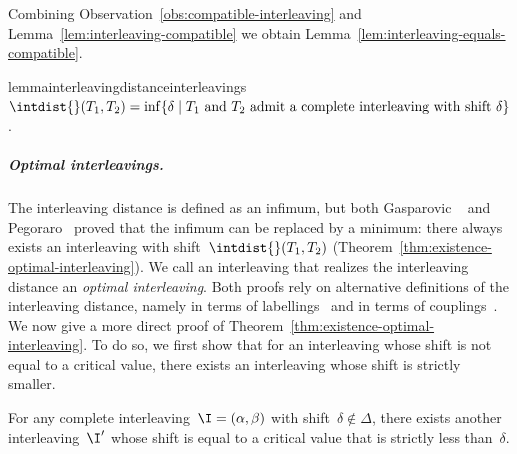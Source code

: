 %
\noindent
Combining Observation~\ref{obs:compatible-interleaving} and Lemma~\ref{lem:interleaving-compatible} we obtain Lemma~\ref{lem:interleaving-equals-compatible}.
%
\begin{restatable}{lemma}{interleavingdistanceinterleavings}
\label{lem:interleaving-equals-compatible}
	$\intdist{}(T_1, T_2) = \inf\{\delta \mid T_1 \text{ and } T_2 \text{ admit a complete interleaving with shift } \delta \}$.
\end{restatable}
%
\subparagraph{Optimal interleavings.}
The interleaving distance is defined as an infimum, but both Gasparovic \etal~\cite{gasparovic2019intrinsic} and Pegoraro~\cite{pegoraro2025graph-matching} proved that the infimum can be replaced by a minimum: there always exists an interleaving with shift~$\intdist{}(T_1, T_2)$ (Theorem~\ref{thm:existence-optimal-interleaving}).
We call an interleaving that realizes the interleaving distance an \emph{optimal interleaving}.
Both proofs rely on alternative definitions of the interleaving distance, namely in terms of labellings~\cite{gasparovic2019intrinsic} and in terms of couplings~\cite{pegoraro2025graph-matching}.
We now give a more direct proof of Theorem~\ref{thm:existence-optimal-interleaving}.
To do so, we first show that for an interleaving whose shift is not equal to a critical value, there exists an interleaving whose shift is strictly smaller.
%
\newpage
\begin{lemma}\label{lem:existence-optimal-interleaving}
	For any complete interleaving~$\I = (\alpha, \beta)$ with shift~$\delta \notin \Delta$, there exists another interleaving~$\I'$ whose shift is equal to a critical value that is strictly less than~$\delta$.
\end{lemma}
